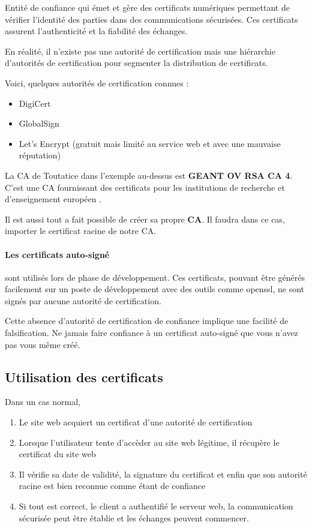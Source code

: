\documentclass[french, 12pt]{article}%
\newcommand{\itemE}{\item[$\bullet$]}
\newcommand{\titreencadre}{Titre}
\newenvironment{encadre}[1]{\renewcommand{\titreencadre}{#1}
	\begin{mdframed}[style=encadrestyle]
	\vspace{0.5\baselineskip}
	}{%
	\end{mdframed}}
\begin{document}
\begin{encadre}{Autorité de certification (ou CA)}
Entité de confiance qui émet et gère des certificats numériques permettant de vérifier l'identité des parties dans des communications sécurisées. Ces certificats assurent l'authenticité et la fiabilité des échanges.
\end{encadre}

En réalité, il n'existe pas une autorité de certification mais une hiérarchie d'autorités de certification pour segmenter la distribution de certificats. 

Voici, quelques autorités de certification connues : 
\begin{itemize}
\itemE DigiCert
\itemE GlobalSign
\itemE Let's Encrypt (gratuit mais limité au service web et avec une mauvaise réputation)
\end{itemize}

La CA de Toutatice dans l'exemple au-dessus est  \textbf{GEANT OV RSA CA 4}. C'est une CA fournissant des certificats pour les institutions de recherche et d'enseignement européen .

\vspace{0.5cm}

Il est aussi tout a fait possible de créer sa propre \textbf{CA}. Il faudra dans ce cas, importer le certificat racine de notre CA. 



\paragraph{Les certificats auto-signé} sont utilisés lors de phase de développement. Ces certificats, pouvant être générés facilement sur un poste de développement avec des outils comme openssl, ne sont signés par aucune autorité de certification.

Cette absence d’autorité de certification de confiance implique une facilité de falsification. Ne jamais faire confiance à un certificat auto-signé que vous n’avez pas vous même créé.


\subsection{Utilisation des certificats}

Dans un cas normal, 
\begin{enumerate}
\item Le site web acquiert un certificat d’une autorité de certification
\item Lorsque l’utilisateur tente d’accèder au site web légitime, il récupère le certificat du site web
\item Il vérifie sa date de validité, la signature du certificat et enfin que son autorité racine est bien reconnue comme étant de confiance
\item Si tout est correct, le client a authentifié le serveur web, la communication sécurisée peut être établie et les échanges peuvent commencer.
\end{enumerate}
\end{document}
